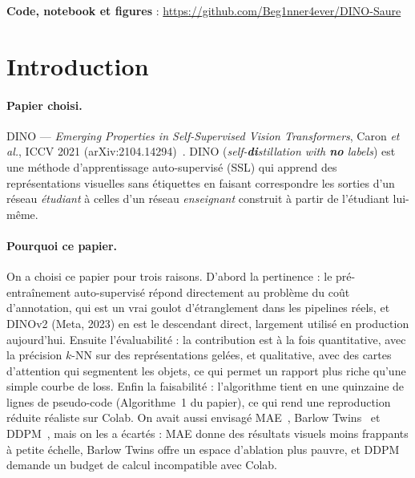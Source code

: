 \documentclass[11pt,a4paper]{article}
\begin{document}
\begin{center}
\small\textbf{Code, notebook et figures} : \url{https://github.com/Beg1nner4ever/DINO-Saure}
\end{center}

\vspace{0.5cm}
\tableofcontents
\listoffigures
\listoftables
\clearpage
{}

\section{Introduction}

\paragraph{Papier choisi.} DINO --- \emph{Emerging Properties in Self-Supervised Vision
Transformers}, Caron \emph{et al.}, ICCV 2021 (arXiv:2104.14294)~\cite{caron2021dino}. DINO
(\emph{self-\textbf{di}stillation with \textbf{no} labels}) est une méthode d'apprentissage
auto-supervisé (SSL) qui apprend des représentations visuelles sans étiquettes en faisant
correspondre les sorties d'un réseau \emph{étudiant} à celles d'un réseau \emph{enseignant}
construit à partir de l'étudiant lui-même.

\paragraph{Pourquoi ce papier.} On a choisi ce papier pour trois raisons. D'abord la pertinence :
le pré-entraînement auto-supervisé répond directement au problème du coût d'annotation, qui est
un vrai goulot d'étranglement dans les pipelines réels, et DINOv2 (Meta, 2023) en est le
descendant direct, largement utilisé en production aujourd'hui. Ensuite l'évaluabilité : la
contribution est à la fois quantitative, avec la précision $k$-NN sur des représentations gelées,
et qualitative, avec des cartes d'attention qui segmentent les objets, ce qui permet un rapport
plus riche qu'une simple courbe de loss. Enfin la faisabilité : l'algorithme tient en une
quinzaine de lignes de pseudo-code (Algorithme~1 du papier), ce qui rend une reproduction réduite
réaliste sur Colab. On avait aussi envisagé MAE~\cite{he2022mae}, Barlow
Twins~\cite{zbontar2021barlow} et DDPM~\cite{ho2020ddpm}, mais on les a écartés : MAE donne
des résultats visuels moins frappants à petite échelle, Barlow Twins offre un espace d'ablation
plus pauvre, et DDPM demande un budget de calcul incompatible avec Colab.
\end{document}
